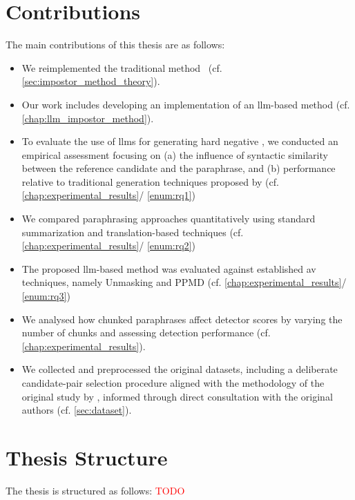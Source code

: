 


\section{Contributions}
\label{sec:contributions}
The main contributions of this thesis are as follows:
\begin{itemize}
    \item We reimplemented the traditional \imp{} method~\citep{koppel_determining_2014} (cf. \autoref{sec:impostor_method_theory}).
    \item Our work includes developing an implementation of an \ac{llm}-based \imp{} method (cf. \autoref{chap:llm_impostor_method}). 
    \item To evaluate the use of \acp{llm} for generating hard negative \imps{}, we conducted an empirical assessment focusing on (a) the influence of syntactic similarity between the reference candidate and the paraphrase, and (b) performance relative to traditional \imp{} generation techniques proposed by \citet{koppel_determining_2014} (cf. \autoref{chap:experimental_results}/ \ref{enum:rq1})
    \item We compared paraphrasing approaches quantitatively using standard summarization and translation-based techniques (cf. \autoref{chap:experimental_results}/ \ref{enum:rq2})
    \item The proposed \ac{llm}-based \imp{} method was evaluated against established \ac{av} techniques, namely Unmasking and PPMD (cf. \autoref{chap:experimental_results}/ \ref{enum:rq3})
    \item We analysed how chunked paraphrases affect detector scores by varying the number of chunks and assessing detection performance (cf. \autoref{chap:experimental_results}).
    \item We collected and preprocessed the original datasets, including a deliberate candidate-pair selection procedure aligned with the methodology of the original study by \citet{koppel_determining_2014}, informed through direct consultation with the original authors (cf. \autoref{sec:dataset}).
\end{itemize}


\section{Thesis Structure}
\label{sec:thesis_structure}
The thesis is structured as follows:
\textcolor{red}{TODO}